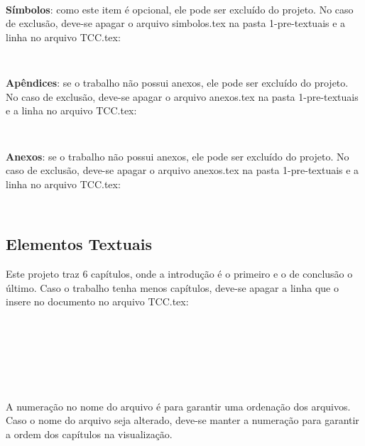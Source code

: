 \begin{alineas}
\begin{verbatim}
    
	\end{verbatim}
	\endgroup      
	\item \textbf{Símbolos}: como este item é opcional, ele pode ser excluído do projeto. No caso de exclusão, deve-se apagar o arquivo simbolos.tex na pasta 1-pre-textuais e a linha no arquivo TCC.tex:
	\begingroup
	\begin{verbatim}
    
	\end{verbatim}
	\endgroup      
	\item \textbf{Apêndices}: se o trabalho não possui anexos, ele pode ser excluído do projeto. No caso de exclusão, deve-se apagar o arquivo anexos.tex na pasta 1-pre-textuais e a linha no arquivo TCC.tex:
	\begingroup
	\begin{verbatim}
    
	\end{verbatim}
	\endgroup      
	\item \textbf{Anexos}: se o trabalho não possui anexos, ele pode ser excluído do projeto. No caso de exclusão, deve-se apagar o arquivo anexos.tex na pasta 1-pre-textuais e a linha no arquivo TCC.tex:
	\begingroup
	\begin{verbatim}
    
	\end{verbatim}
	\endgroup
\end{alineas}

\subsection{Elementos Textuais}

Este projeto traz 6 capítulos, onde a introdução é o primeiro e o de conclusão o último. Caso o trabalho tenha menos capítulos, deve-se apagar a linha que o insere no documento no arquivo TCC.tex: 
 
\begingroup
\begin{verbatim}  
    
    
    
    
    
    
\end{verbatim}
\endgroup

A numeração no nome do arquivo é para garantir uma ordenação dos arquivos. Caso o nome do arquivo seja alterado, deve-se manter a numeração para garantir a ordem dos capítulos na visualização. 

